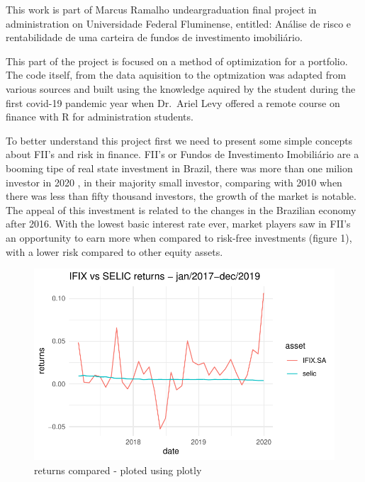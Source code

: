 \documentclass[
]{article}
\begin{document}
This work is part of Marcus Ramalho undeargraduation final project in
administration on Universidade Federal Fluminense, entitled: Análise de
risco e rentabilidade de uma carteira de fundos de investimento
imobiliário.

This part of the project is focused on a method of optimization for a
portfolio. The code itself, from the data aquisition to the optmization
was adapted from various sources and built using the knowledge aquired
by the student during the first covid-19 pandemic year when Dr.~Ariel
Levy offered a remote course on finance with R for administration
students.

To better understand this project first we need to present some simple
concepts about FII's and risk in finance. FII's or Fundos de
Investimento Imobiliário are a booming tipe of real state investment in
Brazil, there was more than one milion investor in 2020 , in their
majority small investor, comparing with 2010 when there was less than
fifty thousand investors, the growth of the market is notable. The
appeal of this investment is related to the changes in the Brazilian
economy after 2016. With the lowest basic interest rate ever, market
players saw in FII's an opportunity to earn more when compared to
risk-free investments (figure 1), with a lower risk compared to other
equity assets.

\begin{figure}

{\centering \includegraphics{FII_portfolio_opt_R_files/figure-pdf/Graph_1-1.pdf}

}

\caption{returns compared - ploted using plotly}

\end{figure}
\end{document}
